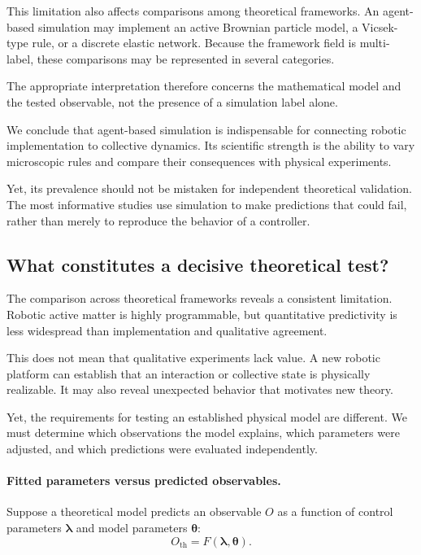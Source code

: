 This limitation
also affects
comparisons among
theoretical frameworks.
An agent-based
simulation may
implement an
active Brownian
particle model,
a Vicsek-type
rule, or a
discrete elastic
network.
Because the
framework field
is multi-label,
these comparisons
may be represented
in several categories.

The appropriate
interpretation
therefore concerns
the mathematical
model and the
tested observable,
not the presence
of a simulation
label alone.

We conclude that
agent-based simulation
is indispensable
for connecting
robotic implementation
to collective dynamics.
Its scientific
strength is the
ability to vary
microscopic rules
and compare their
consequences with
physical experiments.

Yet, its prevalence
should not be
mistaken for
independent theoretical
validation.
The most informative
studies use simulation
to make predictions
that could fail,
rather than merely
to reproduce
the behavior
of a controller.

\subsection{What constitutes a decisive theoretical test?}
\label{sec:theory-decisive}

The comparison across theoretical frameworks
reveals a consistent limitation.
Robotic active matter is highly programmable,
but quantitative predictivity is less
widespread than implementation and
qualitative agreement.

This does not mean that qualitative
experiments lack value.
A new robotic platform can establish
that an interaction or collective
state is physically realizable.
It may also reveal unexpected
behavior that motivates
new theory.

Yet, the requirements for
testing an established
physical model are different.
We must determine which
observations the model
explains, which parameters
were adjusted, and which
predictions were evaluated
independently.

\paragraph*{Fitted parameters versus predicted observables.}

Suppose a theoretical model predicts
an observable $O$ as a function of
control parameters $\boldsymbol{\lambda}$
and model parameters $\boldsymbol{\theta}$:
\begin{equation}
O_{\mathrm{th}}
=
F(\boldsymbol{\lambda},
  \boldsymbol{\theta}).
\label{eq:theory-prediction}
\end{equation}


